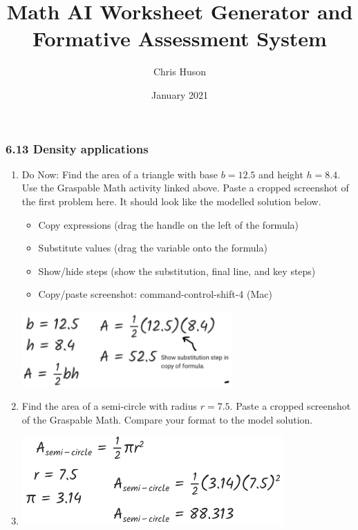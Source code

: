 \documentclass[12pt, twoside]{article}
\title{Math AI Worksheet Generator and Formative Assessment System}
\author{Chris Huson}
\date{January 2021}
\begin{document}
\subsubsection*{6.13 Density applications}
\begin{enumerate}

\item Do Now: Find the area of a triangle with base $b=12.5$ and height $h=8.4$. Use the Graspable Math activity linked above. Paste a cropped screenshot of the first problem here. It should look like the modelled solution below.
\begin{itemize}[label=$\square$]
  \item Copy expressions (drag the handle on the left of the formula)
  \item Substitute values (drag the variable onto the formula)
  \item Show/hide steps (show the substitution, final line, and key steps)
  \item Copy/paste screenshot: command-control-shift-4 (Mac)
\end{itemize}
\begin{flushright}
  \includegraphics[width=8cm]{6-13-1_model-solution.png}
\end{flushright}

\newpage
\item Find the area of a semi-circle with radius $r=7.5$. Paste a cropped screenshot of the Graspable Math. Compare your format to the model solution.
\item \vspace{4cm}
\begin{flushright}
  \includegraphics[width=10cm]{6-13-2-solution.png}
\end{flushright}


\end{enumerate}
\end{document}
